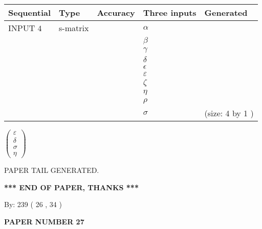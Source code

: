 \documentclass[12pt]{article}
\begin{document}
  
\noindent\begin{tabular}{|l|l|l|l|l|}
\hline
 Sequential & Type & Accuracy & Three inputs & Generated \\ 
\hline
 
 
  INPUT $  4 $ & s-matrix & & 
 $  \alpha $ & 
  \\
  & & & 
 $  \beta $ & 
  \\
  & & & 
 $  \gamma $ & 
  \\
  & & & 
 $  \delta $ & 
  \\
  & & & 
 $  \epsilon $ & 
  \\
  & & & 
 $  \varepsilon $ & 
  \\
  & & & 
 $                     \zeta $ & 
  \\
  & & & 
 $  \eta $ & 
  \\
  & & & 
 $  \rho $ & 
  \\
  & & & 
 $  \sigma $ & 
  (size:  4  by  1 )
 \\  \hline  
 \end{tabular}
   
   
 $  \left( \begin{array}
 {
 c
 }
 \varepsilon \\ 
 \delta \\ 
 \sigma \\ 
 \eta
 \end{array} \right) $ 
   
   
   
   
 \vspace{0.2in}
 
   
   
\vspace{2.0in} PAPER TAIL GENERATED.
   
   
   
   
\vspace{1.0in} 
{\textbf{\large{ *** END OF PAPER, THANKS *** }}} 
   
   
\hspace{1.0in} By: 
 239 ( 26 ,  34 )
   
   
   
   
\newpage 
\setcounter{page}{ 
    27001 } 
   
   
   
   
 {\textbf{ \Large{ PAPER NUMBER  27  }}}
   
   
\vspace{0.2in}
   
   
   
\end{document}
